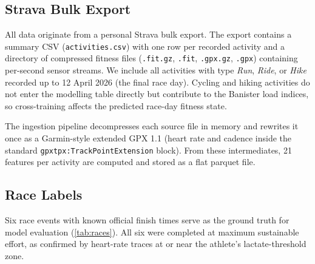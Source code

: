 \documentclass[11pt, a4paper]{article}
\begin{document}
\subsection{Strava Bulk Export}
\label{ssec:strava_export}

All data originate from a personal Strava bulk export.
The export contains a summary CSV (\texttt{activities.csv}) with one row per
recorded activity and a directory of compressed fitness files
(\texttt{.fit.gz}, \texttt{.fit}, \texttt{.gpx.gz}, \texttt{.gpx}) containing
per-second sensor streams.
We include all activities with type \emph{Run}, \emph{Ride}, or \emph{Hike}
recorded up to 12 April 2026 (the final race day).
Cycling and hiking activities do not enter the modelling table directly but
contribute to the Banister load indices, so cross-training affects the
predicted race-day fitness state.

The ingestion pipeline decompresses each source file in memory and rewrites
it once as a Garmin-style extended GPX 1.1 (heart rate and cadence inside the
standard \texttt{gpxtpx:}\allowbreak\texttt{TrackPointExtension} block).
From these intermediates, \num{21} features per activity are computed and
stored as a flat parquet file.

\subsection{Race Labels}
\label{ssec:race_labels}

Six race events with known official finish times serve as the ground truth
for model evaluation (\cref{tab:races}).
All six were completed at maximum sustainable effort, as confirmed by
heart-rate traces at or near the athlete's lactate-threshold zone.
\end{document}
